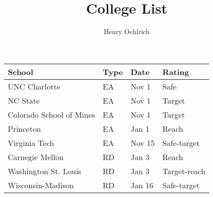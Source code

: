 \documentclass{article}
\title{College List}
\author{Henry Oehlrich}
\begin{document}
\maketitle
\centering
\begin{tabular}{p{5cm}p{1cm}p{1.5cm}p{2.5cm}}
    \toprule
    School & Type & Date & Rating \\
    \midrule
    UNC Charlotte & EA & Nov 1 & Safe \\
    NC State & EA & Nov 1 & Target \\
    Colorado School of Mines & EA & Nov 1 & Target \\
    Princeton & EA & Jan 1 & Reach \\
    Virginia Tech & EA & Nov 15 & Safe-target \\
    Carnegie Mellon & RD & Jan 3 & Reach \\
    Washington St. Louis & RD & Jan 3 & Target-reach \\
    Wisconsin-Madison & RD & Jan 16 & Safe-target \\
    \bottomrule
\end{tabular}
\end{document}
